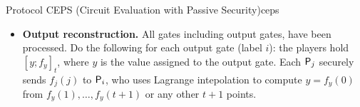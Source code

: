 \begin{protocol}{Protocol CEPS (Circuit Evaluation with Passive Security)}{ceps}
\begin{itemize}
\begin{itemize}
\begin{enumerate}
        Each $\P_i$ distributes $[h(i);f_i]_t$
        \item Note that $\text{deg}(h) = 2t \leq n-1$. Let $\mathbf{r}$ be the recombination vector (i.e. $\mathbf{r} = (r_1, \dots, r_n)$ where $h(0) = \sum_{i=1}^n r_ih(i))$ for any polynomial $h$ of degree $\leq n-1$. The players compute
        \begin{align*}
          \sum_i r_i[h(i);f_i]_t &= [\sum_i r_ih(i) ; \sum_i r_if_i]_t \\
                                &= [h(0);\sum_ir_if_i]_t = [ab ; \sum_ir_if_i]_t
        \end{align*}
      \end{enumerate}
    \end{itemize}
  
  	\item \textbf{Output reconstruction.} All gates including output gates, have been processed. Do the following for each output gate (label $i$): the players hold $[y;f_y]_t$, where $y$ is the value assigned to the output gate. Each $\P_j$ securely sends $f_j(j)$ to $\P_i$, who uses Lagrange intepolation to compute $y=f_y(0)$ from $f_y(1), \dots, f_y(t+1)$ or any other $t+1$ points.
  \end{itemize}
\end{protocol}

